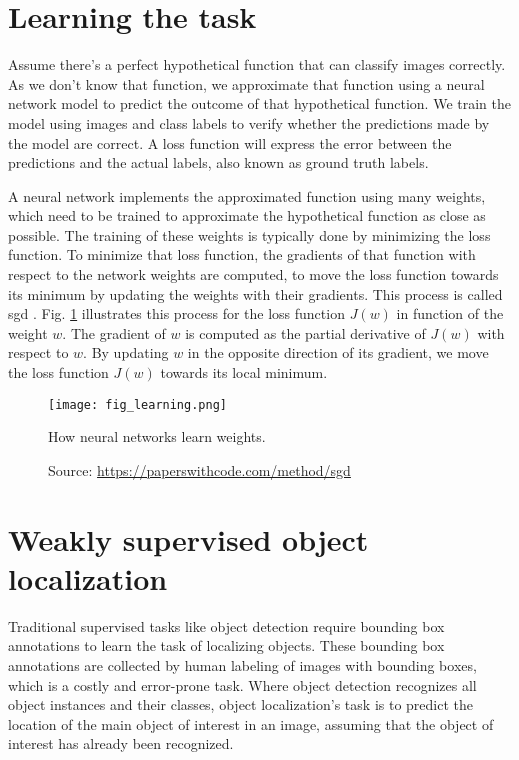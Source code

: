 \section{Learning the task}
Assume there's a perfect hypothetical function that can classify images correctly. As we don't know that function, we approximate that function using a neural network model to predict the outcome of that hypothetical function. We train the model using images and class labels to verify whether the predictions made by the model are correct. A loss function will express the error between the predictions and the actual labels, also known as ground truth labels.

A neural network implements the approximated function using many weights, which need to be trained to approximate the hypothetical function as close as possible. The training of these weights is typically done by minimizing the loss function. To minimize that loss function, the gradients of that function with respect to the network weights are computed, to move the loss function towards its minimum by updating the weights with their gradients. This process is called \acrfull{sgd} \cite{amari1993backpropagation}. Fig. \ref{fig:learning} illustrates this process for the loss function $J(w)$ in function of the weight $w$. The gradient of $w$ is computed as the partial derivative of $J(w)$ with respect to $w$. By updating $w$ in the opposite direction of its gradient, we move the loss function $J(w)$ towards its local minimum.
\begin{figure}[ht]
    \begin{center}       
    \texttt{[image: fig\_learning.png]}
    \caption[How neural networks learn weights]{How neural networks learn weights.}
    \caption*{Source: \href{https://paperswithcode.com/method/sgd}{https://paperswithcode.com/method/sgd}}
    \label{fig:learning}
    \end{center}
\end{figure}

\section{Weakly supervised object localization}
Traditional supervised tasks like object detection require bounding box annotations to learn the task of localizing objects. These bounding box annotations are collected by human labeling of images with bounding boxes, which is a costly and error-prone task. Where object detection recognizes all object instances and their classes, object localization's task is to predict the location of the main object of interest in an image, assuming that the object of interest has already been recognized.

